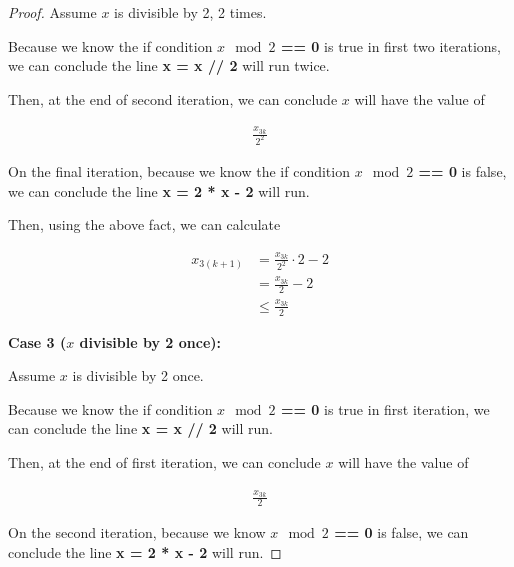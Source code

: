 \documentclass[12pt]{article}
\begin{document}
\begin{enumerate}[a.]
\begin{proof}
        \bigskip

        Assume $x$ is divisible by 2, 2 times.

        \bigskip

        Because we know the if condition \textbf{$x \mod 2$ == 0} is true in first two
        iterations, we can conclude the line \textbf{x = x // 2} will run twice.

        \bigskip

        Then, at the end of second iteration, we can conclude $x$ will have the value of

        \begin{align}
            \frac{x_{3k}}{2^2}
        \end{align}

        \bigskip

        On the final iteration, because we know the if condition \textbf{$x \mod 2$ == 0}
        is false, we can conclude the line \textbf{x = 2 * x - 2} will run.

        \bigskip

        Then, using the above fact, we can calculate

        \begin{align}
            x_{3(k+1)} &= \frac{x_{3k}}{2^2} \cdot 2 - 2\\
            &= \frac{x_{3k}}{2} - 2\\
            &\leq \frac{x_{3k}}{2}
        \end{align}

        \bigskip

        \textbf{Case 3 ($x$ divisible by 2 once):}

        \bigskip

        Assume $x$ is divisible by 2 once.

        \bigskip

        Because we know the if condition \textbf{$x \mod 2$ == 0} is true in first iteration,
        we can conclude the line \textbf{x = x // 2} will run.

        \bigskip

        Then, at the end of first iteration, we can conclude $x$ will have the value
        of

        \begin{align}
            \frac{x_{3k}}{2}
        \end{align}

        \bigskip

        On the second iteration, because we know \textbf{$x \mod 2$ == 0} is false,
        we can conclude the line \textbf{x = 2 * x - 2} will run.


\end{proof}
\end{enumerate}
\end{document}
